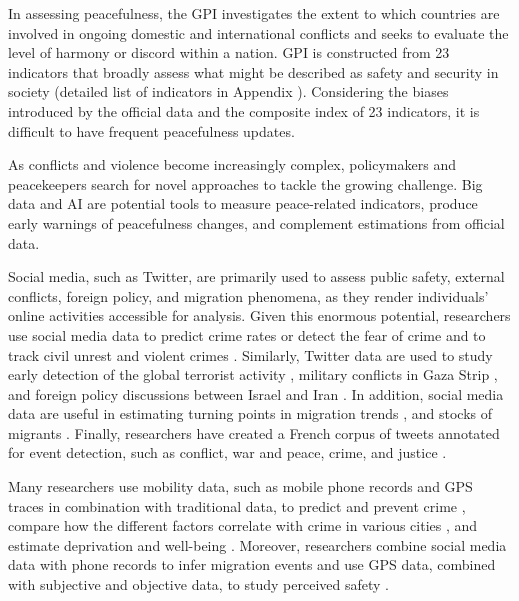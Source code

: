 \documentclass{bmcart}
\begin{document}
In assessing peacefulness, the GPI investigates the extent to which countries are involved in ongoing domestic and international conflicts and seeks to evaluate the level of harmony or discord within a nation. GPI is constructed from 23 indicators that broadly assess what might be described as safety and security in society \cite{gpi_report_2020} (detailed list of indicators in Appendix ). 
Considering the biases introduced by the official data and the composite index of 23 indicators, it is difficult to have frequent peacefulness updates. 

As conflicts and violence become increasingly complex, policymakers and peacekeepers search for novel approaches to tackle the growing challenge. 
Big data and AI are potential tools to measure peace-related indicators, produce early warnings of peacefulness changes, and complement estimations from official data.

Social media, such as Twitter, are primarily used to assess public safety, external conflicts, foreign policy, and migration phenomena, as they render individuals' online activities accessible for analysis. 
Given this enormous potential, researchers use social media data to predict crime rates or detect the fear of crime \cite{chen2015crime, al2016predicting, kadar2017measuring,  curiel2020crime} and to track civil unrest and violent crimes \cite{chen2014non, neill2014crime, neill2007detecting,tucker2021tweets,spangler2021let}. 
Similarly, Twitter data are used to study early detection of the global terrorist activity \cite{najjar2021sentiment}, military conflicts in Gaza Strip \cite{zeitzoff2011using, siapera2015gazaunderattack}, and foreign policy discussions between Israel and Iran \cite{zeitzoff2015using}. 
In addition, social media data are useful in estimating turning points in migration trends \cite{zagheni2014inferring}, and stocks of migrants \cite{zagheni2017leveraging, alexander2020combining}. 
Finally, researchers have created a French corpus of tweets annotated for event detection, such as conflict, war and peace, crime, and justice \cite{mazoyer2020french}.

Many researchers use mobility data, such as mobile phone records and GPS traces \cite{toch2019analyzing, pappalardo2021scikitmobility, blondel2015survey, andrienko2021so, luca2021survey} in combination with traditional data, to predict and prevent crime \cite{bogomolov2014once, ariel2017predictable, ferrara2014detecting, robinson2016spatial,wu2020addressing}, compare how the different factors correlate with crime in various cities \cite{de2020socio}, and estimate deprivation and well-being \cite{pappalardo2016analytical, pappalardo2015using, marchetti2015small, eagle2010network}. 
Moreover, researchers combine social media data with phone records to infer migration events \cite{chi2020general, sirbu2020human, hankaew2019inferring, lai2019exploring, pappalardo2021inferring, deville2014dynamic} and use GPS data, combined with subjective and objective data, to study perceived safety \cite{daviera2020safe}. 
\end{document}
